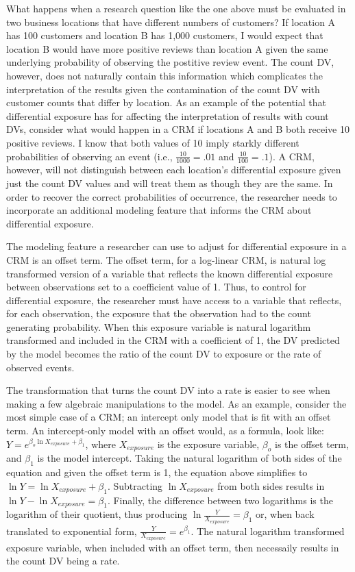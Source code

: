 \documentclass[ShortAfour,times,sageapa]{sagej}
\begin{document}
	What happens when a research question like the one above must be evaluated in two business locations that have different numbers of customers?
	If location A has 100 customers and location B has 1,000 customers, I would expect that location B would have more positive reviews than location A given the same underlying probability of observing the postitive review event.	
	The count DV, however, does not naturally contain this information which complicates the interpretation of the results given the contamination of the count DV with customer counts that differ by location. 
	As an example of the potential that differential exposure has for affecting the interpretation of results with count DVs, consider what would happen in a CRM if locations A and B both receive 10 positive reviews.
	I know that both values of 10 imply starkly different probabilities of observing an event (i.e., $\frac{10}{1000} = .01$ and $\frac{10}{100} = .1$).
	A CRM, however, will not distinguish between each location's differential exposure given just the count DV values and will treat them as though they are the same.
	In order to recover the correct probabilities of occurrence, the researcher needs to incorporate an additional modeling feature that informs the CRM about differential exposure.
	
	The modeling feature a researcher can use to adjust for differential exposure in a CRM is an offset term.  
	The offset term, for a log-linear CRM, is natural log transformed version of a variable that reflects the known differential exposure between observations set to a coefficient value of 1.
	Thus, to control for differential exposure, the researcher must have access to a variable that reflects, for each observation, the exposure that the observation had to the count generating probability.
	When this exposure variable is natural logarithm transformed and included in the CRM with a coefficient of 1, the DV predicted by the model becomes the ratio of the count DV to exposure or the rate of observed events.
	
	The transformation that turns the count DV into a rate is easier to see when making a few algebraic manipulations to the model.
	As an example, consider the most simple case of a CRM; an intercept only model that is fit with an offset term.
	An intercept-only model with an offset would, as a formula, look like: $Y = e^{\beta_o\ln X_{exposure} + \beta_1}$, where $X_{exposure}$ is the exposure variable, $\beta_o$ is the offset term, and $\beta_1$ is the model intercept.
	Taking the natural logarithm of both sides of the equation and given the offset term is 1, the equation above simplifies to $\ln Y = \ln X_{exposure} + \beta_1$.
	Subtracting $\ln X_{exposure}$ from both sides results in $\ln Y - \ln X_{exposure} = \beta_1$.
	Finally, the difference between two logarithms is the logarithm of their quotient, thus producing $\ln \frac{Y}{X_{exposure}} = \beta_1$ or, when back translated to exponential form, $\frac{Y}{X_{exposure}} = e^{\beta_1}$.
	The natural logarithm transformed exposure variable, when included with an offset term, then necessaily results in the count DV being a rate.
	
\end{document}
